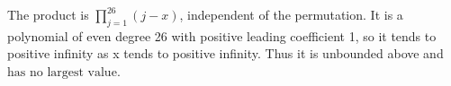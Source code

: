 The product is $\prod_{j=1}^{26}(j-x)$, independent of the permutation. It is a polynomial of even degree 26 with positive leading coefficient 1, so it tends to positive infinity as x tends to positive infinity. Thus it is unbounded above and $\boxed{\text{has no largest value}}$.

